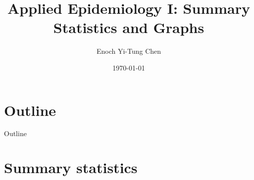 


\title[Applied Epi I: Summary Statistics and Graphs]{Applied Epidemiology I: Summary Statistics and Graphs}
\date{\today}
\author[Enoch Yi-Tung Chen]{Enoch Yi-Tung Chen}




\begin{frame}
\maketitle 
\end{frame}




\section*{Outline}
\begin{frame}{Outline}
          \tableofcontents
\end{frame}

\section{Summary statistics}
